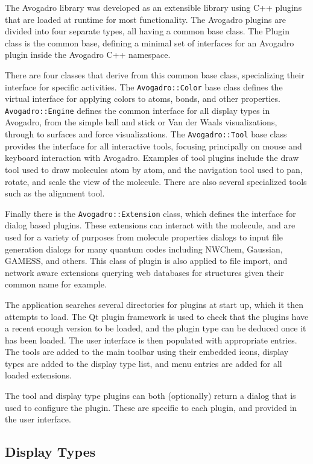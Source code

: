 \documentclass[10pt]{bmc_article}
\newenvironment{bmcformat}{\begin{raggedright}
\baselineskip20pt\sloppy\setboolean{publ}{false}}{\end{raggedright}
\baselineskip20pt\sloppy}
\begin{document}
\begin{bmcformat}
The Avogadro library was developed as an extensible library using C++ plugins
that are loaded at runtime for most functionality. The Avogadro plugins are
divided into four separate types, all having a common base class. The Plugin
class is the common base, defining a minimal set of interfaces for an Avogadro
plugin inside the Avogadro C++ namespace.

There are four classes that derive from this common base class, specializing
their interface for specific activities. The {\tt Avogadro::Color} base class defines
the virtual interface for applying colors to atoms, bonds, and other properties.
 {\tt Avogadro::Engine} defines the common interface for all display types in Avogadro,
from the simple ball and stick or Van der Waals visualizations, through to
surfaces and force visualizations. The {\tt Avogadro::Tool} base class provides
the interface for all interactive tools, focusing principally on mouse and
keyboard interaction with Avogadro. Examples of tool plugins include the draw
tool used to draw molecules atom by atom, and the navigation tool used to pan,
rotate, and scale the view of the molecule. There are also several specialized
tools such as the alignment tool.

Finally there is the {\tt Avogadro::Extension} class, which defines the interface for
dialog based plugins. These extensions can interact with the molecule, and are
used for a variety of purposes from molecule properties dialogs to input file
generation dialogs for many quantum codes including NWChem, Gaussian, GAMESS, and
others. This class of plugin is also applied to file import, and network aware
extensions querying web databases for structures given their common name for
example.

The application searches several directories for plugins at start up,
which it then attempts to load. The Qt plugin framework is used to check that
the plugins have a recent enough version to be loaded, and the plugin type can
be deduced once it has been loaded. The user interface is then populated with
appropriate entries. The tools are added to the main toolbar using their
embedded icons, display types are added to the display type list, and menu
entries are added for all loaded extensions.

The tool and display type plugins can both (optionally) return a dialog that is
used to configure the plugin. These are specific to each plugin, and provided in
the user interface.

\subsection{Display Types}


\end{bmcformat}
\end{document}
